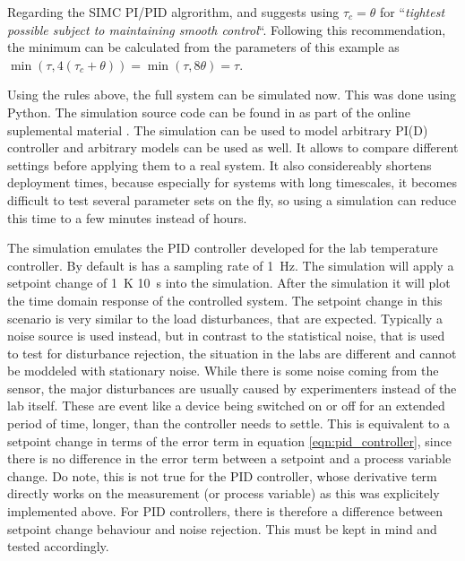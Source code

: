 Regarding the SIMC PI/PID algrorithm, \citeauthor{simc_paper} \cite{simc_paper} and \citep[ch. 5]{simc} suggests using $\tau_c = \theta$ for “\textit{tightest possible subject to maintaining smooth control}“. Following this recommendation, the minimum can be calculated from the parameters of this example as $\min\left(\tau, 4 (\tau_c+\theta)\right) = \min\left(\tau, 8 \theta\right) = \tau$.

Using the rules above, the full system can be simulated now. This was done using Python. The simulation source code can be found in  as part of the online suplemental material \cite{supplemental_material}. The simulation can be used to model arbitrary PI(D) controller and arbitrary models can be used as well. It allows to compare different settings before applying them to a real system. It also considereably shortens deployment times, because especially for systems with long timescales, it becomes difficult to test several parameter sets on the fly, so using a simulation can reduce this time to a few minutes instead of hours.

The simulation emulates the PID controller developed for the lab temperature controller. By default is has a sampling rate of \qty{1}{\Hz}. The simulation  will apply a setpoint change of \qty{+1}{\K} \qty{10}{\s} into the simulation. After the simulation it will plot the time domain response of the controlled system. The setpoint change in this scenario is very similar to the load disturbances, that are expected. Typically a noise source is used instead, but in contrast to the statistical noise, that is used to test for disturbance rejection, the situation in the labs are different and cannot be moddeled with stationary noise. While there is some noise coming from the sensor, the major disturbances are usually caused by experimenters instead of the lab itself. These are event like a device being switched on or off for an extended period of time, longer, than the controller needs to settle. This is equivalent to a setpoint change in terms of the error term in equation \ref{eqn:pid_controller}, since there is no difference in the error term between a setpoint and a process variable change. Do note, this is not true for the PID controller, whose derivative term directly works on the measurement (or process variable) as this was explicitely implemented above. For PID controllers, there is therefore a difference between setpoint change behaviour and noise rejection. This must be kept in mind and tested accordingly.

